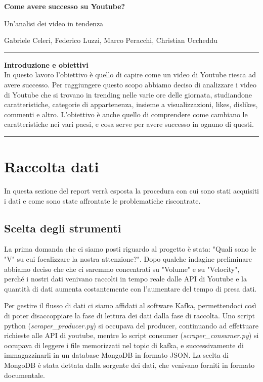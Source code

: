 \documentclass[10pt, a4paper,openany]{article}
\begin{document}
\begin{center}
\huge\textbf{Come avere successo su Youtube?}

Un'analisi dei video in tendenza
\end{center}

\begin{center}
Gabriele Celeri, Federico Luzzi,  Marco Peracchi, Christian Uccheddu
\end{center}

\hrule
\vspace{0.5cm}

\begin{center}\textbf{{Introduzione e obiettivi}}
\\

In questo lavoro l'obiettivo è quello di capire come un video di Youtube riesca ad avere successo. Per raggiungere questo scopo abbiamo deciso di analizzare i video di Youtube che si trovano in trending nelle varie ore delle giornata, studiandone caratteristiche, categorie di appartenenza, insieme a visualizzazioni, likes, dislikes, commenti e altro.
L'obiettivo è anche quello di comprendere come cambiano le caratteristiche nei vari paesi, e cosa serve per avere successo in ognuno di questi.

\vspace{0.5cm}
\hrule
\end{center}

\section*{Raccolta dati}

In questa sezione del report verrà esposta la procedura con cui sono stati acquisiti i dati e come sono state affrontate le problematiche riscontrate.
\subsection*{Scelta degli strumenti}
La prima domanda che ci siamo posti riguardo al progetto è stata: "Quali sono le "V" su cui focalizzare la nostra attenzione?".
Dopo qualche indagine preliminare abbiamo deciso che che ci saremmo concentrati su "Volume" e su "Velocity", perché i nostri dati venivano raccolti in tempo reale dalle API di Youtube e la quantità di dati aumenta costantemente con l'aumentare del tempo di presa dati.

Per gestire il flusso di dati ci siamo affidati al software Kafka, permettendoci così di poter disaccoppiare la fase di lettura dei dati dalla fase di  raccolta. Uno script python (\textit{scraper\_producer.py}) si occupava del producer, continuando ad effettuare richieste alle API di youtube, mentre lo script consumer (\textit{scraper\_consumer.py}) si occupava di leggere i file memorizzati nel topic di kafka, e successivamente di immagazzinarli in un database MongoDB in formato JSON. La scelta di MongoDB è stata dettata dalla sorgente dei dati, che venivano forniti in formato documentale.
 
\end{document}
